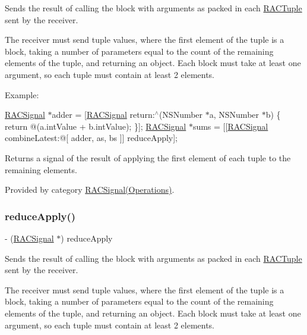 Sends the result of calling the block with arguments as packed in each \mbox{\hyperlink{interface_r_a_c_tuple}{R\+A\+C\+Tuple}} sent by the receiver.

The receiver must send tuple values, where the first element of the tuple is a block, taking a number of parameters equal to the count of the remaining elements of the tuple, and returning an object. Each block must take at least one argument, so each tuple must contain at least 2 elements.

Example\+:

\mbox{\hyperlink{interface_r_a_c_signal}{R\+A\+C\+Signal}} $\ast$adder = \mbox{[}\mbox{\hyperlink{interface_r_a_c_signal}{R\+A\+C\+Signal}} return\+:$^\wedge$(N\+S\+Number $\ast$a, N\+S\+Number $\ast$b) \{ return @(a.\+int\+Value + b.\+int\+Value); \}\mbox{]}; \mbox{\hyperlink{interface_r_a_c_signal}{R\+A\+C\+Signal}} $\ast$sums = \mbox{[}\mbox{[}\mbox{\hyperlink{interface_r_a_c_signal}{R\+A\+C\+Signal}} combine\+Latest\+:@\mbox{[} adder, as, bs \mbox{]}\mbox{]} reduce\+Apply\mbox{]};

Returns a signal of the result of applying the first element of each tuple to the remaining elements. 

Provided by category \mbox{\hyperlink{category_r_a_c_signal_07_operations_08_a60241be15dba6de172d2ab14be09b657}{R\+A\+C\+Signal(\+Operations)}}.

\mbox{\label{interface_r_a_c_signal_a60241be15dba6de172d2ab14be09b657}} 
\subsubsection{\texorpdfstring{reduce\+Apply()}{reduceApply()}\hspace{0.1cm}{\footnotesize\ttfamily [2/3]}}
{\footnotesize\ttfamily -\/ (\mbox{\hyperlink{interface_r_a_c_signal}{R\+A\+C\+Signal}} $\ast$) reduce\+Apply \begin{DoxyParamCaption}{ }\end{DoxyParamCaption}}

Sends the result of calling the block with arguments as packed in each \mbox{\hyperlink{interface_r_a_c_tuple}{R\+A\+C\+Tuple}} sent by the receiver.

The receiver must send tuple values, where the first element of the tuple is a block, taking a number of parameters equal to the count of the remaining elements of the tuple, and returning an object. Each block must take at least one argument, so each tuple must contain at least 2 elements.

